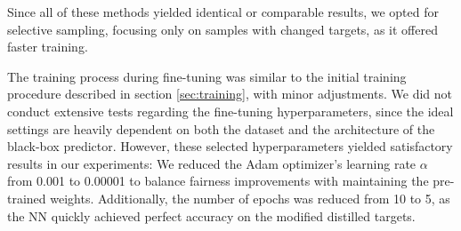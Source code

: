 Since all of these methods yielded identical or comparable results, we opted for selective sampling,  
focusing only on samples with changed targets, as it offered faster training.  

The training process during fine-tuning was similar to the initial training procedure
described in section \ref{sec:training}, with minor adjustments.
We did not conduct extensive tests regarding the fine-tuning hyperparameters,
since the ideal settings are heavily dependent on both the 
dataset and the architecture of the black-box predictor.
However, these selected hyperparameters yielded satisfactory results in our experiments:
We reduced the Adam optimizer's learning rate $\alpha$ from 0.001
to 0.00001 to balance fairness improvements with maintaining the pre-trained weights.
Additionally, the number of epochs was reduced from 10 to 5,
as the NN quickly achieved perfect accuracy on the modified distilled targets.


